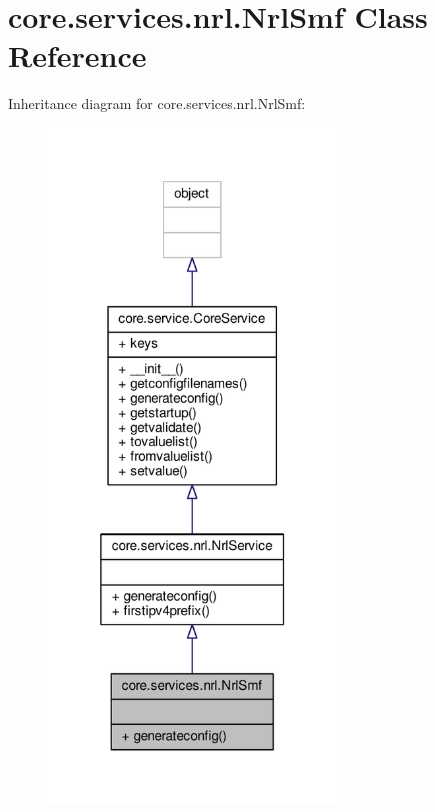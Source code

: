 \hypertarget{classcore_1_1services_1_1nrl_1_1_nrl_smf}{\section{core.\+services.\+nrl.\+Nrl\+Smf Class Reference}
\label{classcore_1_1services_1_1nrl_1_1_nrl_smf}
}


Inheritance diagram for core.\+services.\+nrl.\+Nrl\+Smf\+:
\nopagebreak
\begin{figure}[H]
\begin{center}
\leavevmode
\includegraphics[width=217pt]{classcore_1_1services_1_1nrl_1_1_nrl_smf__inherit__graph}
\end{center}
\end{figure}


